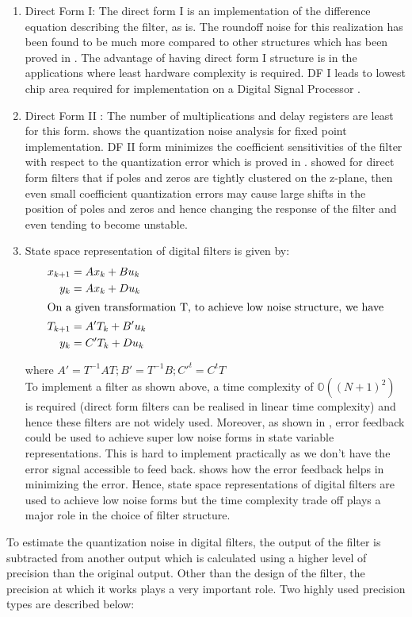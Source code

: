 \documentclass[colorlinks=true,pdfstartview=FitV,linkcolor=blue,
            citecolor=red,urlcolor=magenta]{ligodoc}
\begin{document}
		\begin{enumerate}
		\item Direct Form I: The direct form I is an implementation of the difference equation describing the filter, as is. The roundoff noise for this realization has been found to be much more compared to other structures which has been proved in \cite{Oppenheim}. The advantage of having direct form I structure is in the applications where least hardware complexity is required. DF I leads to lowest chip area required for implementation on a Digital Signal Processor \cite{Rahmanian}.
		\item Direct Form II : The number of multiplications and delay registers are least for this form. \cite{Oppenheim} shows the quantization noise analysis for fixed point implementation. DF II form minimizes the coefficient sensitivities of the filter with respect to the quantization error which is proved in \cite{Rahmanian}.
		\cite{Kaiser} showed for direct form filters that if poles and zeros are tightly clustered on the z-plane, then even small coefficient quantization errors may cause large shifts in the position of poles and zeros and hence changing the response of the filter and even tending to become unstable.
		\item State space representation of digital filters is given by:
\begin{align}
x_{k+1} &= Ax_{k} + Bu_{k} \\
y_{k} &= Ax_{k} + Du_{k} \\
\intertext {On a given transformation T, to achieve low noise structure, we have}
T_{k+1} &= A'T_{k} + B'u_{k}\\
y_{k} &= C'T_{k} + Du_{k}
\end{align}

where $A'=T^{-1}AT; B'=T^{-1}B; C'^{t}=C^{t}T$
\\To implement a filter as shown above, a time complexity of $\mathbb{O}((N+1)^{2})$ is required (direct form filters can be realised in linear time complexity) and hence these filters are not widely used. Moreover, as shown in \cite{Chang}, error feedback could be used to achieve super low noise forms in state variable representations. This is hard to implement practically as we don't have the error signal accessible to feed back. \cite{Mullis} shows how the error feedback helps in minimizing the error. Hence, state space representations of digital filters are used to achieve low noise forms but the time complexity trade off plays a major role in the choice of filter structure.
		\end{enumerate}
	 To estimate the quantization noise in digital filters, the output of the filter is subtracted from another output which is calculated using a higher level of precision than the original output. Other than the design of the filter, the precision at which it works plays a very important role. Two highly used precision types are described below:
\end{document}
